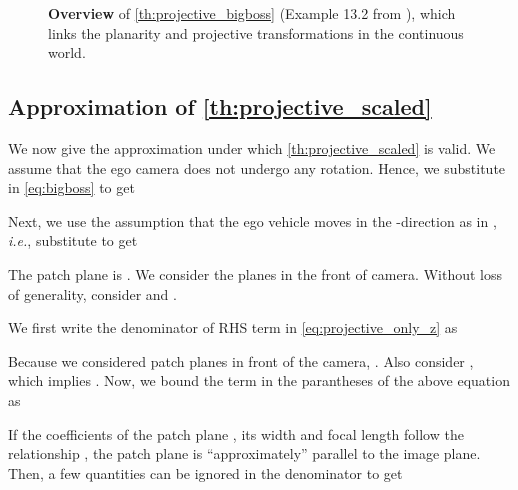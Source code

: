 \documentclass[runningheads]{llncs}
\newcommand{\twoD}{D}
\newcommand{\plane}{patch plane}
\newcommand{\thatIs}{\textit{i.e.}}
\begin{document}
\begin{figure}[!htb]
             \caption{
                \textbf{Overview} of \cref{th:projective_bigboss} (Example 13.2 from \cite{hartley2003multiple}), which links the planarity and projective transformations in the continuous world.
            }
            \label{fig:high_level}
        \end{figure}
    

\subsection{Approximation of \cref{th:projective_scaled}}\label{sec:approximation_proof}
        We now give the approximation under which \cref{th:projective_scaled} is valid.
        We assume that the ego camera does not undergo any rotation. Hence, we substitute  in \cref{eq:bigboss} to get
            
        Next, we use the assumption that the ego vehicle moves in the -direction as in \cite{brazil2020kinematic},  \thatIs, substitute  to get
        

        The \plane{} is . 
        We consider the planes in the front of camera. 
        Without loss of generality, consider  and .
    
        We first write the denominator  of RHS term in \cref{eq:projective_only_z} as
        
        Because we considered \plane s in front of the camera, . 
        Also consider , which implies .
        Now, we bound the term in the parantheses of the above equation as
        
        
        If the coefficients of the patch plane , its width  and focal length  follow the relationship , the \plane{} is ``approximately''  parallel to the image plane.
        Then, a few quantities can be ignored in the denominator  to get
        
\end{document}
